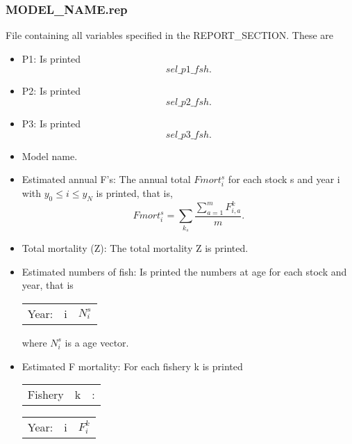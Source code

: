 \documentclass{article}
\begin{document}
    \subsubsection{MODEL\_NAME.rep} File containing all variables specified in the REPORT\_SECTION. These are 
    \begin{itemize}
        \item P1: Is printed \begin{equation*}
            sel\_p1\_fsh.
        \end{equation*}
        \item P2: Is printed  \begin{equation*}
            sel\_p2\_fsh.
        \end{equation*}
        \item P3: Is printed \begin{equation*}
            sel\_p3\_fsh.
        \end{equation*}
    \item Model name.
    \item Estimated annual F's:  The annual total $Fmort^s_{i}$ for each stock s and year i with $y_0 \leq i \leq y_N$ is printed, that is,
    \begin{equation*}
        Fmort^s_i= \sum_{k_s} \dfrac{\sum_{a=1}^mF^{k}_{i,a}}{m}.
    \end{equation*}

   \item Total mortality (Z): The total mortality Z is printed.
    \item Estimated numbers of fish: Is printed the numbers at age for each stock and year, that is
    \begin{center}
    \begin{tabular}{c c c}
        Year: & i & $N^s_{i}$\\
    \end{tabular}
        \end{center}
where $N^s_i$ is a age vector.
    \item Estimated F mortality: For each fishery k is printed
    \begin{center}
        \begin{tabular}{c c c}
           Fishery  &  k & : \\
            
        \end{tabular}
    \end{center}
    \begin{center}
        \begin{tabular}{c c c }
          Year:   & i  & $F^k_i$ \\
        

\end{tabular}
\end{center}
\end{itemize}
\end{document}
